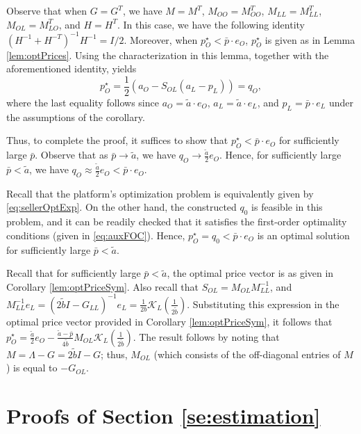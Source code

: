 \documentclass[opre,nonblindrev]{informs3} %
\begin{document}
\begin{APPENDIX}{}
Observe that when $G=G^T$, we have $M=M^T$, $M_{OO}=M_{OO}^T$, $M_{LL}=M_{LL}^T$, $M_{OL}=M_{LO}^T$, and $H=H^T$.
In this case, we have the following identity $(H^{-1}+H^{-T})^{-1} H^{-1}=I/2 $.
Moreover, when ${p}_O^\star<\bar p \cdot {e}_O$, ${p}_O^\star$ is given as in Lemma \ref{lem:optPrices}.
Using the characterization in this lemma, together with the aforementioned identity, yields
\[
{p}_O^\star = \frac{1}{2}
({a}_O-S_{OL}({a}_L-{p}_L) )={q}_O,
\]
where the last equality follows
since ${a}_O=\tilde a \cdot {e}_O$,
${a}_L=\tilde{a} \cdot {e}_L$, and ${p}_L=\bar{p} \cdot {e}_L$ under the assumptions of the corollary.


Thus, to complete the proof, it suffices to show that ${p}_O^\star < \bar p \cdot {e}_O$ for sufficiently large $\bar p$.
Observe that  as $\bar p \rightarrow \tilde{a}$, we have ${q}_O \rightarrow \frac{\tilde{a}}{2} {e}_O$.
Hence,  for sufficiently large $\bar p< \tilde{a}$, we have ${q}_O \approx   \frac{\tilde{a}}{2} {e}_O < \bar p \cdot {e}_O$.

Recall that the platform's optimization problem is equivalently given by \eqref{eq:sellerOptExp}. On the other hand, the constructed ${q}_0$ is feasible in this problem, and it can be readily checked that it satisfies the first-order optimality conditions (given in \eqref{eq:auxFOC}). Hence, ${p}_O^\star={q}_0<\bar p \cdot {e}_O$ is an optimal solution for sufficiently large $\bar p< \tilde a$.
\hfill \Halmos
\endproof

Recall that for sufficiently large $\bar p< \tilde a$, the optimal price vector is as given in Corollary \ref{lem:optPriceSym}.
Also recall that
$S_{OL}=M_{OL} M_{LL}^{-1}$, and
$M_{LL}^{-1}{e}_L= (2\tilde{b}I-G_{LL})^{-1} {e}_L=\frac{1}{2b}  \mathcal{K}_L(\frac{1}{2\tilde{b}})$.
Substituting this expression in the optimal price vector provided in Corollary \ref{lem:optPriceSym}, it follows that
$	{p}_O^\star=
\frac{\tilde a}{2}{e}_O-
\frac{\tilde a-\bar p}{4\tilde{b}}
M_{OL}   \mathcal{K}_L(\frac{1}{2\tilde{b}})$. The result follows by noting that $M=\Lambda-G=2\tilde{b}I-G$; thus, $M_{OL}$ (which consists of the off-diagonal entries of  $M$) is equal to $-G_{OL}$. \hfill \Halmos
\endproof    	

\newpage
\section{Proofs of Section \ref{se:estimation}}
\label{app:estimation}



\end{APPENDIX}
\end{document}
